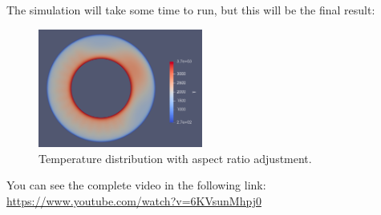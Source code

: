 \documentclass{article}
\begin{document}
The simulation will take some time to run, but this will be the final result:

\begin{figure}[h!]
\centering
\includegraphics[width=0.48\textwidth]{ascii_temperature_aspect.png}
\caption{Temperature distribution with aspect ratio adjustment.}
\label{fig:ascii-temperature-aspect}
\end{figure}

You can see the complete video in the following link:
\url{https://www.youtube.com/watch?v=6KVsunMhpj0}
\end{document}
